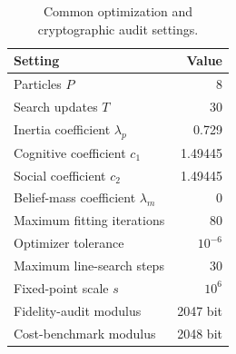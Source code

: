 \begin{table}[!t]
\centering
\caption{Common optimization and cryptographic audit settings.}
\label{tab:ja-common-settings}
\scriptsize
\setlength{\tabcolsep}{3pt}
\begin{tabular*}{\columnwidth}{@{\extracolsep{\fill}}lr@{}}
\toprule
\textbf{Setting} & \textbf{Value}\\
\midrule
Particles $P$ & 8\\
Search updates $T$ & 30\\
Inertia coefficient $\lambda_p$ & 0.729\\
Cognitive coefficient $c_1$ & 1.49445\\
Social coefficient $c_2$ & 1.49445\\
Belief-mass coefficient $\lambda_m$ & 0\\
Maximum fitting iterations & 80\\
Optimizer tolerance & $10^{-6}$\\
Maximum line-search steps & 30\\
Fixed-point scale $s$ & $10^6$\\
Fidelity-audit modulus & 2047 bit\\
Cost-benchmark modulus & 2048 bit\\
\bottomrule
\end{tabular*}
\end{table}
